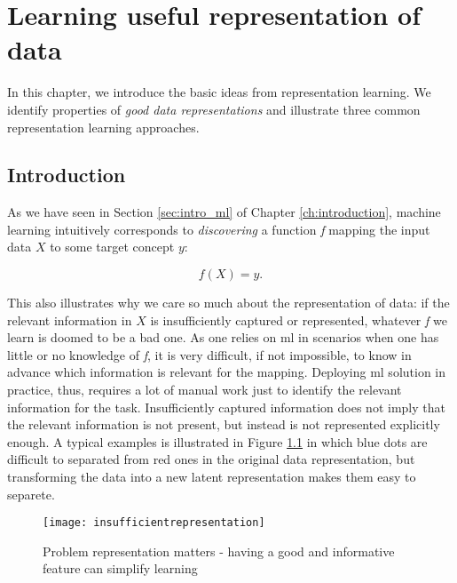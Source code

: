\chapter{Learning useful representation of data}\label{ch:learningrepresentations}



In this chapter, we introduce the basic ideas from representation learning.
We identify properties of \textit{good data representations} and illustrate three common representation learning approaches.




\section{Introduction}


As we have seen in Section \ref{sec:intro_ml} of Chapter \ref{ch:introduction}, machine learning intuitively corresponds to \textit{discovering} a function \textit{f} mapping the input data $X$ to some target concept $y$:

\begin{equation}
	f(X) = y.
	\label{eq:ml}
\end{equation}


This also illustrates why we care so much about the representation of data: if the relevant information in $X$ is insufficiently captured or represented, whatever \textit{f} we learn  is doomed to be a bad one.
As one relies on \gls{ml} in scenarios when one has little or no knowledge of \textit{f}, it is very difficult, if not impossible, to know in advance which information is relevant for the mapping.
Deploying \gls{ml} solution in practice, thus, requires a lot of manual work just to identify the relevant information for the task.
Insufficiently captured information does not imply that the relevant information is not present, but instead is not represented explicitly enough.
A typical examples is illustrated in Figure \ref{fig:transform} in which blue dots are difficult to separated from red ones in the original data representation, but transforming the data into a new latent representation makes them easy to separete.


\begin{figure}
	\centering
	\texttt{[image: insufficientrepresentation]}
	\caption{Problem representation matters - having a good and informative feature can simplify learning\label{fig:transform}}
\end{figure}

